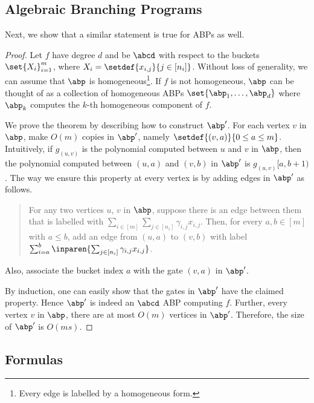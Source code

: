 \subsection{Algebraic Branching Programs}\label{sec:orderABPs}

Next, we show that a similar statement is true for ABPs as well.

\orderABP*

\begin{proof}
	Let $f$ have degree $d$ and be $\abcd$ with respect to the buckets $\set{X_i}_{i=1}^{m}$, where $X_i = \setdef{x_{i,j}}{j \in [n_i]}$.	
	Without loss of generality, we can assume that $\abp$ is homogeneous\footnote{Every edge is labelled by a homogeneous form.}.
	If $f$ is not homogeneous, $\abp$ can be thought of as a collection of homogeneous ABPs $\set{\abp_1, \ldots, \abp_d}$ where $\abp_k$ computes the $k$-th homogeneous component of $f$. 
	
	We prove the theorem by describing how to construct $\abp'$. 
	For each vertex $v$ in $\abp$, make $O(m)$ copies in $\abp'$, namely $\setdef{(v, a)}{0 \leq a \leq m}$. 
	Intuitively, if $g_{(u,v)}$ is the polynomial computed between $u$ and $v$ in $\abp$, then the polynomial computed between $(u, a)$ and $(v, b)$ in $\abp'$ is $g_{(u,v)}[a,b+1)$.
	The way we ensure this property at every vertex is by adding edges in $\abp'$ as follows.
	
	\begin{quote}
		For any two vertices $u$, $v$ in $\abp$, suppose there is an edge between them that is labelled with $\sum_{i \in [m]} \sum_{j \in [n_i]} \gamma_{i,j} x_{i,j}.$ 
		Then, for every $a, b \in [m]$ with $a \leq b$, add an edge from $(u, a)$ to $(v, b)$ with label $\sum_{i = a}^{b} \inparen{\sum_{j \in [n_i]} \gamma_{i,j} x_{i,j}}$.
	\end{quote}

	\noindent Also, associate the bucket index $a$ with the gate $(v, a)$ in $\abp'$. 
	
	By induction, one can easily show that the gates in $\abp'$ have the claimed property.
	Hence $\abp'$ is indeed an $\abcd$ ABP computing $f$.
	Further, every vertex $v$ in $\abp$, there are at most $O(m)$ vertices in $\abp'$.
	Therefore, the size of $\abp'$ is $O(ms)$.
\end{proof}

\subsection{Formulas}\label{sec:orderForms}

